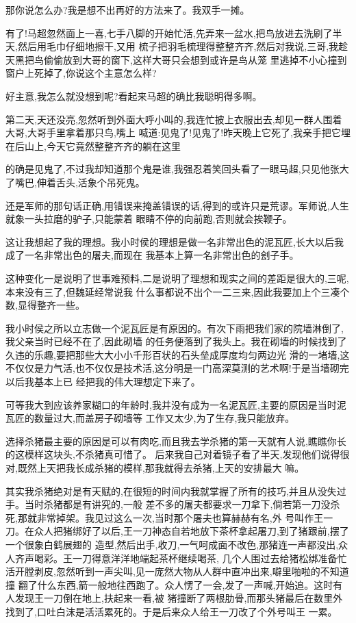 ﻿\documentclass[12pt,twocolumn]{article}
\begin{document}
那你说怎么办?我是想不出再好的方法来了。我双手一摊。

有了!马超忽然面上一喜,七手八脚的开始忙活,先弄来一盆水,把鸟放进去洗刷了半天,然后用毛巾仔细地擦干,又用
梳子把羽毛梳理得整整齐齐,然后对我说,三哥,我趁天黑把鸟偷偷放到大哥的窗下,这样大哥只会想到或许是鸟从笼
里逃掉不小心撞到窗户上死掉了,你说这个主意怎么样?

好主意,我怎么就没想到呢?看起来马超的确比我聪明得多啊。

第二天,天还没亮,忽然听到外面大呼小叫的,我连忙披上衣服出去,却见一群人围着大哥,大哥手里拿着那只鸟,嘴上
喊道:见鬼了!见鬼了!昨天晚上它死了,我亲手把它埋在后山上,今天它竟然整整齐齐的躺在这里\dldots 

的确是见鬼了,不过我却知道那个鬼是谁,我强忍着笑回头看了一眼马超,只见他张大了嘴巴,伸着舌头,活象个吊死鬼。

还是军师的那句话正确,用错误来掩盖错误的话,得到的或许只是荒谬。军师说,人生就象一头拉磨的驴子,只能蒙着
眼睛不停的向前跑,否则就会挨鞭子。

这让我想起了我的理想。我小时侯的理想是做一名非常出色的泥瓦匠,长大以后我成了一名非常出色的屠夫,而现在
我基本上算一名非常出色的刽子手。

这种变化一是说明了世事难预料,二是说明了理想和现实之间的差距是很大的,三呢,本来没有三了,但魏延经常说我
什么事都说不出个一二三来,因此我要加上个三凑个数,显得整齐一些。

我小时侯之所以立志做一个泥瓦匠是有原因的。有次下雨把我们家的院墙淋倒了,我父亲当时已经不在了,因此砌墙
的任务便落到了我头上。我在砌墙的时候找到了久违的乐趣,要把那些大大小小千形百状的石头垒成厚度均匀两边光
滑的一堵墙,这不仅仅是力气活,也不仅仅是技术活,这分明是一门高深莫测的艺术啊!于是当墙砌完以后我基本上已
经把我的伟大理想定下来了。

可等我大到应该养家糊口的年龄时,我并没有成为一名泥瓦匠,主要的原因是当时泥瓦匠的数量过大,而盖房子砌墙等
工作又太少,为了生存,我只能放弃。

选择杀猪最主要的原因是可以有肉吃,而且我去学杀猪的第一天就有人说,瞧瞧你长的这模样这块头,不杀猪真可惜了。
后来我自己对着镜子看了半天,发现他们说得很对,既然上天把我长成杀猪的模样,那我就得去杀猪,上天的安排最大
嘛。

其实我杀猪绝对是有天赋的,在很短的时间内我就掌握了所有的技巧,并且从没失过手。当时杀猪都是有讲究的,一般
差不多的屠夫都要求一刀拿下,倘若第一刀没杀死,那就非常掉架。我见过这么一次,当时那个屠夫也算赫赫有名,外
号叫作王一刀。在众人把猪绑好了以后,王一刀神态自若地放下茶杯拿起屠刀,到了猪跟前,摆了一个很象白鹤展翅的
造型,然后出手,收刀,一气呵成面不改色,那猪连一声都没出,众人齐声喝彩。王一刀得意洋洋地端起茶杯继续喝茶,
几个人围过去给猪松绑准备忙活开膛剥皮,忽然听到一声尖叫,见一庞然大物从人群中直冲出来,噼里啪啦的不知道撞
翻了什么东西,箭一般地往西跑了。众人愣了一会,发了一声喊,开始追。这时有人发现王一刀倒在地上,扶起来一看,被
猪撞断了两根肋骨,而那头猪最后在数里外找到了,口吐白沫是活活累死的。于是后来众人给王一刀改了个外号叫王
一累。
\end{document}
